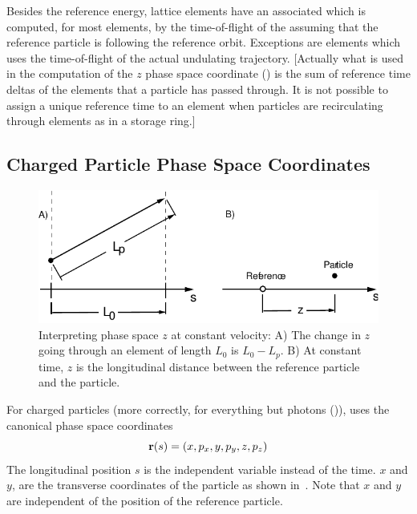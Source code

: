 Besides the reference energy, lattice elements have an associated
 which is computed, for most elements, by the
time-of-flight of the  assuming that the
reference particle is following the reference orbit. Exceptions are
 elements which uses the time-of-flight of the actual
undulating trajectory. [Actually what is used in the computation of the
$z$ phase space coordinate () is the sum of reference time
deltas of the elements that a particle has passed through. It is not
possible to assign a unique reference time to an element when particles
are recirculating through elements as in a storage ring.]

\subsection{Charged Particle Phase Space Coordinates}
\label{s:phase.space}

\begin{figure}
\centering 
\includegraphics{canonical-z.pdf} 
\caption[Interpreting phase space $z$ at constant velocity.]
{Interpreting phase space $z$ at constant velocity: A) The change in $z$
going through an element of length $L_0$ is $L_0 - L_p$.  B) At
constant time, $z$ is the longitudinal distance between the reference
particle and the particle.}
\label{f:canonical.z}
\end{figure}

For charged particles (more correctly, for everything but photons
()), \bmad uses the canonical phase space
coordinates
\begin{equation}
  {\bf r}(s) = (x, p_x, y, p_y, z, p_z)
\end{equation}
The longitudinal position $s$ is the independent variable instead of
the time. $x$ and $y$, are the transverse coordinates of the particle
as shown in~. Note that $x$ and $y$ are independent
of the position of the reference particle.

